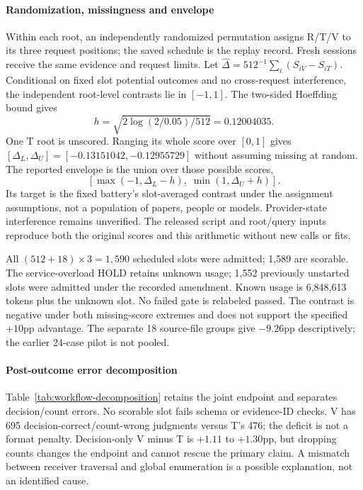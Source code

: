 \paragraph{Randomization, missingness and envelope}
Within each root, an independently randomized permutation assigns R/T/V to its three request positions; the saved schedule is the replay record. Fresh sessions receive the same evidence and request limits. Let $\widehat\Delta=512^{-1}\sum_i(S_{iV}-S_{iT})$. Conditional on fixed slot potential outcomes and no cross-request interference, the independent root-level contrasts lie in $[-1,1]$. The two-sided Hoeffding bound gives
\[
h=\sqrt{2\log(2/0.05)/512}=0.12004035.
\]
One T root is unscored. Ranging its whole score over $[0,1]$ gives $[\Delta_L,\Delta_U]=[-0.13151042,-0.12955729]$ without assuming missing at random. The reported envelope is the union over those possible scores,
\[
[\max(-1,\Delta_L-h),\;\min(1,\Delta_U+h)].
\]
Its target is the fixed battery's slot-averaged contrast under the assignment assumptions, not a population of papers, people or models. Provider-state interference remains unverified. The released script and root/query inputs reproduce both the original scores and this arithmetic without new calls or fits.

All $(512+18)\times3=1,590$ scheduled slots were admitted; 1,589 are scorable. The service-overload HOLD retains unknown usage; 1,552 previously unstarted slots were admitted under the recorded amendment. Known usage is 6,848,613 tokens plus the unknown slot. No failed gate is relabeled passed. The contrast is negative under both missing-score extremes and does not support the specified $+10$pp advantage. The separate 18 source-file groups give $-9.26$pp descriptively; the earlier 24-case pilot is not pooled.

\paragraph{Post-outcome error decomposition}
Table~\ref{tab:workflow-decomposition} retains the joint endpoint and separates decision/count errors. No scorable slot fails schema or evidence-ID checks. V has 695 decision-correct/count-wrong judgments versus T's 476; the deficit is not a format penalty. Decision-only V minus T is $+1.11$ to $+1.30$pp, but dropping counts changes the endpoint and cannot rescue the primary claim. A mismatch between receiver traversal and global enumeration is a possible explanation, not an identified cause.



